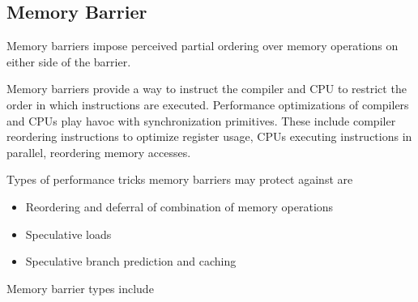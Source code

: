 \documentclass{article}
\begin{document}
\subsection{Memory Barrier}

Memory barriers impose perceived partial ordering over memory
operations on either side of the barrier.

Memory barriers provide a way to instruct the compiler and CPU to
restrict the order in which instructions are executed. Performance
optimizations of compilers and CPUs play havoc with synchronization
primitives. These include compiler reordering instructions to optimize
register usage, CPUs executing instructions in parallel, reordering
memory accesses.


Types of performance tricks memory barriers may protect against are
\begin{itemize}
\item Reordering and deferral of combination of memory operations
\item Speculative loads
\item Speculative branch prediction and caching
\end{itemize}

Memory barrier types include
\end{document}
